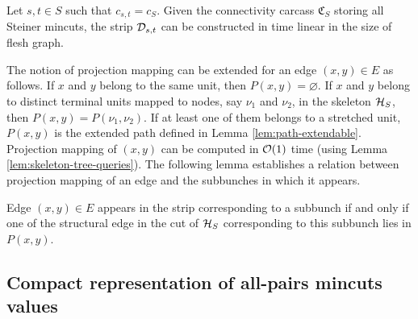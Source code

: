\begin{lemma}
\label{lem:strip-from-carcass}
Let $s,t \in S$ such that $c_{s,t}=c_S$. Given the connectivity carcass ${\mathfrak C}_S$ storing all Steiner mincuts, the strip ${\cal D}_{s,t}$ can be constructed in time linear in the size of flesh graph.
\end{lemma}




The notion of projection mapping can be extended for an edge $(x,y) \in E$ as follows. If $x$ and $y$ belong to the same unit, then $P(x,y) = \varnothing$. If $x$ and $y$ belong to distinct terminal units mapped to nodes, say $\nu_1$ and $\nu_2$, in the skeleton ${\cal H}_S$, then $P(x,y) = P(\nu_1,\nu_2)$. If at least one of them belongs to a stretched unit, $P(x,y)$ is the extended path defined in Lemma \ref{lem:path-extendable}. Projection mapping of $(x,y)$ can be computed in ${\cal O}(1)$ time (using Lemma \ref{lem:skeleton-tree-queries}). The following lemma establishes a relation between projection mapping of an edge and the subbunches in which it appears.

\begin{lemma}
Edge $(x,y)\in E$ appears in the strip corresponding to a subbunch if and only if one of the structural edge in the cut of ${\cal H}_S$ corresponding to this subbunch lies in $P(x,y)$.
\label{lem:edge-path-intersect-subbunch}
\end{lemma}


\subsection{Compact representation of all-pairs mincuts values} \label{subsec:all-pairs-mincuts-values}

